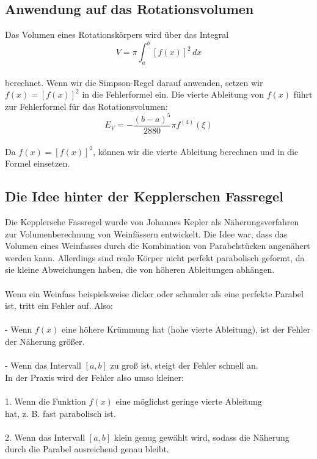 \documentclass[a4paper,final]{report}
\begin{document}
\subsection{Anwendung auf das Rotationsvolumen}

Das Volumen eines Rotationskörpers wird über das Integral
\\
\[
V = \pi \int_a^b [f(x)]^2 \, dx
\]
\\
berechnet. Wenn wir die Simpson-Regel darauf anwenden, setzen wir \( f(x) = [f(x)]^2 \) in die Fehlerformel ein. Die vierte Ableitung von \( f(x) \) führt zur Fehlerformel für das Rotationsvolumen:
\\
\[
E_V = -\frac{(b-a)^5}{2880} \pi f^{(4)}(\xi)
\]
\\
Da \( f(x) = [f(x)]^2 \), können wir die vierte Ableitung berechnen und in die Formel einsetzen.
\newpage
\subsection{Die Idee hinter der Kepplerschen Fassregel}

Die Kepplersche Fassregel wurde von Johannes Kepler als Näherungsverfahren zur Volumenberechnung von Weinfässern entwickelt. Die Idee war, dass das Volumen eines Weinfasses durch die Kombination von Parabelstücken angenähert werden kann. Allerdings sind reale Körper nicht perfekt parabolisch geformt, da sie kleine Abweichungen haben, die von höheren Ableitungen abhängen.
\\
\\
Wenn ein Weinfass beispielsweise dicker oder schmaler als eine perfekte Parabel ist, tritt ein Fehler auf. Also:
\\
\\
- Wenn \( f(x) \) eine höhere Krümmung hat (hohe vierte Ableitung), ist der Fehler der Näherung größer.
\\
\\
- Wenn das Intervall \( [a,b] \) zu groß ist, steigt der Fehler schnell an.
\\
In der Praxis wird der Fehler also umso kleiner:\\
\\
1. Wenn die Funktion \( f(x) \) eine möglichst geringe vierte Ableitung \\
hat, z. B. fast parabolisch ist.\\
\\
2. Wenn das Intervall \( [a,b] \) klein genug gewählt wird, sodass die Näherung durch die Parabel ausreichend genau bleibt.
\\
\cite{hans_riegel_numerische_integration}
\cite{ebelt_kepler_fassformel}
\end{document}
